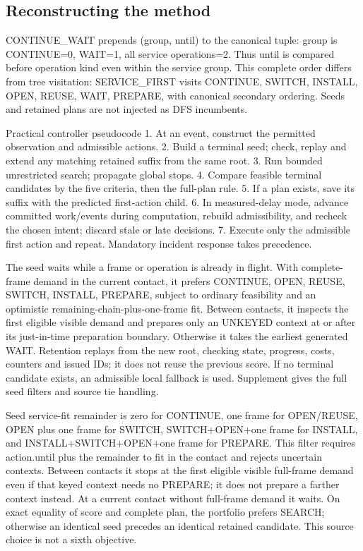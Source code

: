 \documentclass[12pt,a4paper]{article}
\begin{document}
\subsection*{Reconstructing the method}
CONTINUE\_WAIT prepends (group, until) to the canonical tuple: group is CONTINUE=0, WAIT=1, all service operations=2. Thus until is compared before operation kind even within the service group. This complete order differs from tree visitation: SERVICE\_FIRST visits CONTINUE, SWITCH, INSTALL, OPEN, REUSE, WAIT, PREPARE, with canonical secondary ordering. Seeds and retained plans are not injected as DFS incumbents.

Practical controller pseudocode\newline{}
1. At an event, construct the permitted observation and admissible actions.\newline{}
2. Build a terminal seed; check, replay and extend any matching retained suffix from the same root.\newline{}
3. Run bounded unrestricted search; propagate global stops.\newline{}
4. Compare feasible terminal candidates by the five criteria, then the full-plan rule.\newline{}
5. If a plan exists, save its suffix with the predicted first-action child.\newline{}
6. In measured-delay mode, advance committed work/events during computation, rebuild admissibility, and recheck the chosen intent; discard stale or late decisions.\newline{}
7. Execute only the admissible first action and repeat. Mandatory incident response takes precedence.

The seed waits while a frame or operation is already in flight. With complete-frame demand in the current contact, it prefers CONTINUE, OPEN, REUSE, SWITCH, INSTALL, PREPARE, subject to ordinary feasibility and an optimistic remaining-chain-plus-one-frame fit. Between contacts, it inspects the first eligible visible demand and prepares only an UNKEYED context at or after its just-in-time preparation boundary. Otherwise it takes the earliest generated WAIT. Retention replays from the new root, checking state, progress, costs, counters and issued IDs; it does not reuse the previous score. If no terminal candidate exists, an admissible local fallback is used. Supplement gives the full seed filters and source tie handling.

Seed service-fit remainder is zero for CONTINUE, one frame for OPEN/REUSE, OPEN plus one frame for SWITCH, SWITCH+OPEN+one frame for INSTALL, and INSTALL+SWITCH+OPEN+one frame for PREPARE. This filter requires action.until plus the remainder to fit in the contact and rejects uncertain contexts. Between contacts it stops at the first eligible visible full-frame demand even if that keyed context needs no PREPARE; it does not prepare a farther context instead. At a current contact without full-frame demand it waits. On exact equality of score and complete plan, the portfolio prefers SEARCH; otherwise an identical seed precedes an identical retained candidate. This source choice is not a sixth objective.
\end{document}
